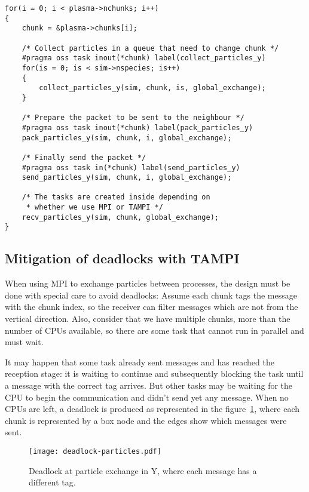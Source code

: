 \begin{lstlisting}[caption={Communication of particles in the Y direction.}]
for(i = 0; i < plasma->nchunks; i++)
{
	chunk = &plasma->chunks[i];

	/* Collect particles in a queue that need to change chunk */
	#pragma oss task inout(*chunk) label(collect_particles_y)
	for(is = 0; is < sim->nspecies; is++)
	{
		collect_particles_y(sim, chunk, is, global_exchange);
	}

	/* Prepare the packet to be sent to the neighbour */
	#pragma oss task inout(*chunk) label(pack_particles_y)
	pack_particles_y(sim, chunk, i, global_exchange);

	/* Finally send the packet */
	#pragma oss task in(*chunk) label(send_particles_y)
	send_particles_y(sim, chunk, i, global_exchange);

	/* The tasks are created inside depending on
	 * whether we use MPI or TAMPI */
	recv_particles_y(sim, chunk, global_exchange);
}
\end{lstlisting}

\subsection{Mitigation of deadlocks with TAMPI}

When using MPI to exchange particles between processes, the design must be done 
with special care to avoid deadlocks: Assume each chunk tags the message with 
the chunk index, so the receiver can filter messages which are not from the 
vertical direction. Also, consider that we have multiple chunks, more than the 
number of CPUs available, so there are some task that cannot run in parallel and 
must wait.

It may happen that some task already sent messages and has reached the reception 
stage: it is waiting to continue and subsequently blocking the task until a 
message with the correct tag arrives. But other tasks may be waiting for the CPU 
to begin the communication and didn't send yet any message. When no CPUs are 
left, a deadlock is produced as represented in the 
figure~\ref{fig:comm_deadlock}, where each chunk is represented by a box node 
and the edges show which messages were sent.
%
\begin{figure}
\centering
\texttt{[image: deadlock-particles.pdf]}
\caption{Deadlock at particle exchange in Y, where each message has a different 
tag.}
\label{fig:comm_deadlock}
\end{figure}

